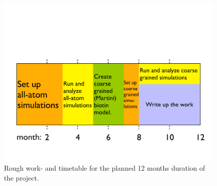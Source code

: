 \documentclass[a4paper,11pt,floatfix,authordate1-4,twocolumn]{revtex4-1}
\begin{document}





\begin{figure}[!hb]
\centering
\includegraphics[width=\columnwidth]{../Figs/timetable.pdf}
\captionsetup{labelformat=empty}
\caption{\label{Fig:timetable}\footnotesize
Rough work- and timetable for the planned 12 months
duration of the project.
}
\end{figure}

\end{document}
